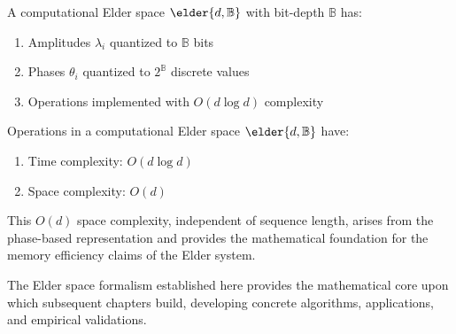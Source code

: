 \begin{definition}
A computational Elder space $\elder{d, \mathbb{B}}$ with bit-depth $\mathbb{B}$ has:
\begin{enumerate}
    \item Amplitudes $\lambda_i$ quantized to $\mathbb{B}$ bits
    \item Phases $\theta_i$ quantized to $2^{\mathbb{B}}$ discrete values
    \item Operations implemented with $O(d \log d)$ complexity
\end{enumerate}
\end{definition}

\begin{theorem}
Operations in a computational Elder space $\elder{d, \mathbb{B}}$ have:
\begin{enumerate}
    \item Time complexity: $O(d \log d)$
    \item Space complexity: $O(d)$
\end{enumerate}
\end{theorem}

This $O(d)$ space complexity, independent of sequence length, arises from the phase-based representation and provides the mathematical foundation for the memory efficiency claims of the Elder system.

The Elder space formalism established here provides the mathematical core upon which subsequent chapters build, developing concrete algorithms, applications, and empirical validations.